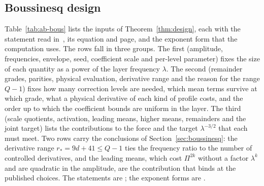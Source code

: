 \documentclass[11pt]{article}
\theoremstyle{remark}
\newcommand{\ev}[1]{\hspace{0.2em}{\small\textsf{[#1]}}}
\begin{document}
\subsection{Boussinesq design}

Table~\ref{tab:ab-bous} lists the inputs of Theorem~\ref{thm:design}, each with the statement read in~\cite{ab-boussinesq},
its equation and page, and the exponent form that the computation uses. The rows fall in three groups. The first
(amplitude, frequencies, envelope, seed, coefficient scale and per-level parameter) fixes the size of each quantity as
a power of the layer frequency $\lambda$. The second (remainder grades, parities, physical evaluation, derivative range
and the reason for the range $Q-1$) fixes how many correction levels are needed, which mean terms survive at which
grade, what a physical derivative of each kind of profile costs, and the order up to which the coefficient bounds are
uniform in the layer. The third (scale quotients, activation, leading means, higher means, remainders and the joint
target) lists the contributions to the force and the target $\lambda^{-3/2}$ that each must meet. Two rows carry
the conclusions of Section~\ref{sec:boussinesq}: the derivative range $r_{*}=9d+41\le Q-1$ ties the frequency ratio
to the number of controlled derivatives, and the leading means, which cost $\Pi^{2k}$ without a factor $\lambda^{k}$ and
are quadratic in the amplitude, are the contribution that binds at the published choices. The statements are \ev{V};
the exponent forms are \ev{D}.
\end{document}
